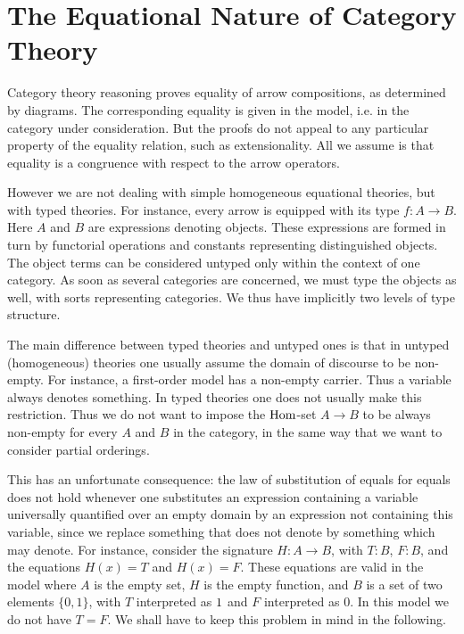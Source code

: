 \section{The Equational Nature of Category Theory}%

Category theory reasoning proves equality of arrow compositions, as determined by diagrams. The
corresponding equality is given in the model, i.e. in the category under consideration. But the
proofs do not appeal to any particular property of the equality relation, such as extensionality. All
we assume is that equality is a congruence with respect to the arrow operators.

However we are not dealing with simple homogeneous equational theories, but with typed
theories. For instance, every arrow is equipped with its type $f : A \to B$. Here $A$ and $B$ are
expressions denoting objects. These expressions are formed in turn by functorial operations and
constants representing distinguished objects. The object terms can be considered untyped only
within the context of one category. As soon as several categories are concerned, we must type
the objects as well, with sorts representing categories. We thus have implicitly two levels of type
structure.

The main difference between typed theories and untyped ones is that in untyped (homogeneous)
theories one usually assume the domain of discourse to be non-empty. For instance, a first-order
model has a non-empty carrier. Thus a variable always denotes something. In typed theories one
does not usually make this restriction. Thus we do not want to impose the $\operatorname{{Hom}}$-set $A\to B$ to be
always non-empty for every $A$ and $B$ in the category, in the same way that we want to consider
partial orderings.

This has an unfortunate consequence: the law of substitution of equals for equals does not hold
whenever one substitutes an expression containing a variable universally quantified over an empty
domain by an expression not containing this variable, since we replace something that does not
denote by something which may denote. For instance, 
consider the signature $H : A \to B$, with $T:B$, $F:B$,
and the equations $H(x) = T$ and $H(x) = F$. These equations are valid in the model
where $A$ is the empty set, $H$ is the empty function,
and $B$ is a set of two elements $\{0,1\}$, with $T$
interpreted as $1$ and $F$ interpreted as $0$. 
In this model we do not have $T= F$. We shall have to
keep this problem in mind in the following.

